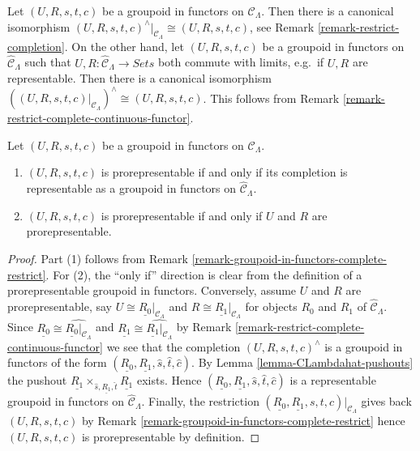 \begin{remark}
\label{remark-groupoid-in-functors-complete-restrict}
Let $(U, R, s, t, c)$ be a groupoid in functors on $\mathcal{C}_\Lambda$.
Then there is a canonical isomorphism
$(U, R, s, t, c)^{\wedge}|_{\mathcal{C}_\Lambda} \cong (U, R, s, t, c)$, see
Remark \ref{remark-restrict-completion}.
On the other hand, let $(U, R, s, t, c)$ be a groupoid in functors on
$\widehat{\mathcal{C}}_\Lambda$ such that
$U, R : \widehat{\mathcal{C}}_\Lambda \to \textit{Sets}$
both commute with limits, e.g.\ if $U, R$ are representable.
Then there is a canonical isomorphism
$((U, R, s, t, c)|_{\mathcal{C}_\Lambda})^{\wedge} \cong (U, R, s, t, c)$.
This follows from
Remark \ref{remark-restrict-complete-continuous-functor}.
\end{remark}

\begin{lemma}
\label{lemma-groupoid-in-functors-prorep-equivalences}
Let $(U, R, s, t, c)$ be a groupoid in functors on $\mathcal{C}_\Lambda$.
\begin{enumerate}
\item $(U, R, s, t, c)$ is prorepresentable if and only if its completion is
representable as a groupoid in functors on $\widehat{\mathcal{C}}_\Lambda$.
\item $(U, R, s, t, c)$ is prorepresentable if and only if $U$ and $R$ are
prorepresentable.
\end{enumerate}
\end{lemma}

\begin{proof}
Part (1) follows from
Remark \ref{remark-groupoid-in-functors-complete-restrict}.
For (2), the ``only if'' direction is clear from the definition
of a prorepresentable groupoid in functors. Conversely, assume $U$ and $R$
are prorepresentable, say $U \cong \underline{R_0}|_{\mathcal{C}_\Lambda}$
and $R \cong \underline{R_1}|_{\mathcal{C}_\Lambda}$ for objects $R_0$ and
$R_1$ of $\widehat{\mathcal{C}}_\Lambda$.
Since $\underline{R_0} \cong \widehat{\underline{R_0}|_{\mathcal{C}_\Lambda}}$
and $\underline{R_1} \cong \widehat{\underline{R_1}|_{\mathcal{C}_\Lambda}}$
by
Remark \ref{remark-restrict-complete-continuous-functor}
we see that the completion $(U, R, s, t, c)^\wedge$ is a groupoid in
functors of the form
$(\underline{R_0}, \underline{R_1}, \widehat{s}, \widehat{t}, \widehat{c})$.
By
Lemma \ref{lemma-CLambdahat-pushouts}
the pushout
$\underline{R_1} \times_{\widehat{s}, \underline{R_1}, \widehat{t}}
\underline{R_1}$ exists. Hence
$(\underline{R_0}, \underline{R_1}, \widehat{s}, \widehat{t}, \widehat{c})$
is a representable groupoid in functors on $\widehat{\mathcal{C}}_\Lambda$.
Finally, the restriction
$(\underline{R_0}, \underline{R_1}, s, t, c)|_{\mathcal{C}_\Lambda}$
gives back $(U, R, s, t, c)$ by
Remark \ref{remark-groupoid-in-functors-complete-restrict}
hence $(U, R, s, t, c)$ is prorepresentable by definition.
\end{proof}






